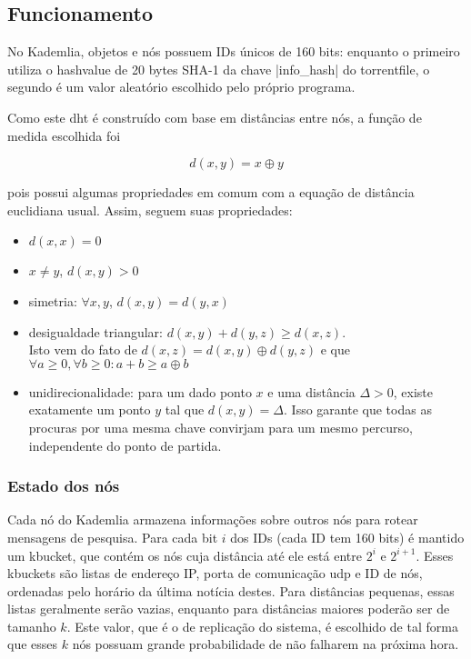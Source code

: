 \begin{itemize}
\subsection*{Funcionamento}

No Kademlia, objetos e nós possuem IDs únicos de 160 bits: enquanto o primeiro utiliza
o \gls*{hashvalue} de 20 bytes SHA-1 da chave \bverb|info_hash| do \gls*{torrentfile},
o segundo é um valor aleatório escolhido pelo próprio programa.

Como este \gls*{dht} é construído com base em distâncias entre nós, a função de medida
escolhida foi

\begin{equation}
    d(x,y) = x \oplus y
\end{equation}

pois possui algumas propriedades em comum com a equação de distância euclidiana usual.
Assim, seguem suas propriedades:

\begin{itemize}
    \item $d(x,x) = 0$
    \item $x \neq y$, $d(x,y) > 0$
    \item simetria: $\forall x,y$, $d(x,y) = d(y,x)$
    \item desigualdade triangular: $d(x,y) + d(y,z) \geq d(x,z)$. \\
        Isto vem do fato de $d(x,z) = d(x,y) \oplus d(y,z)$ e que $\forall a \geq 0,
        \forall b \geq 0 : a + b \geq a \oplus b$
    \item unidirecionalidade: para um dado ponto $x$ e uma distância $\Delta > 0$,
        existe exatamente um ponto $y$ tal que $d(x,y) = \Delta$. Isso garante que todas
        as procuras por uma mesma chave convirjam para um mesmo percurso, independente
        do ponto de partida.
\end{itemize}

\subsubsection*{Estado dos nós}

Cada nó do Kademlia armazena informações sobre outros nós para rotear mensagens de
pesquisa. Para cada bit $i$ dos IDs (cada ID tem 160 bits) é mantido um \gls{kbucket},
que contém os nós cuja distância até ele está entre $2^i$ e $2^{i+1}$. Esses
\glspl*{kbucket} são listas de endereço IP, porta de comunicação \gls*{udp} e ID de
nós, ordenadas pelo horário da última notícia destes. Para distâncias pequenas, essas
listas geralmente serão vazias, enquanto para distâncias maiores poderão ser de tamanho
$k$. Este valor, que é o de replicação do sistema, é escolhido de tal forma que esses
$k$ nós possuam grande probabilidade de não falharem na próxima hora.


\end{itemize}
